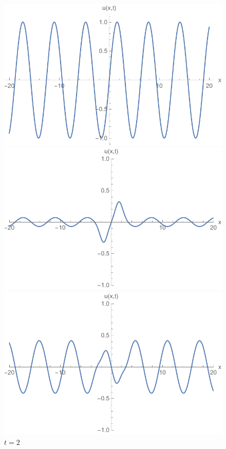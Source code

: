 \documentclass{article}
\begin{document}
\begin{figure}[H]
  \centering
  \begin{minipage}[b]{0.49\textwidth}
    \includegraphics[width=\textwidth]{plot_t_0.pdf}
    \caption{$t = 0$}

  \end{minipage}
  \hfill
  \begin{minipage}[b]{0.49\textwidth}
    \includegraphics[width=\textwidth]{plot_t_15.pdf}
    \caption{$t = 1.5$}

  \end{minipage}
    \hfill
  \begin{minipage}[b]{0.49\textwidth}
    \includegraphics[width=\textwidth]{plot_t_2.pdf}
    \caption{$t = 2$}


\end{minipage}
\end{figure}
\end{document}
